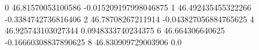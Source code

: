 0 46.81570053100586 -0.015209197998046875
1 46.492435455322266 -0.3384742736816406
2 46.78708267211914 -0.043827056884765625
4 46.925743103027344 0.0948333740234375
6 46.664306640625 -0.16660308837890625
8 46.830909729003906 0.0
